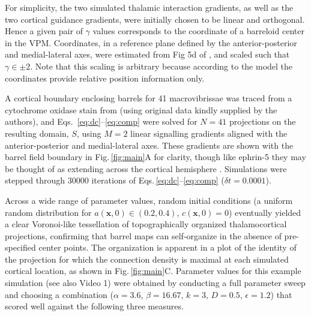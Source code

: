 \documentclass[9pt,lineno]{elife}
\newcommand{\cmnt}[1]{\textcolor{colcmnt}{#1}}
\newcommand{\mb}[1]{\mathbf{#1}}
\begin{document}
\cmnt{For simplicity, the two simulated thalamic interaction gradients, as
  well as the two cortical guidance gradients, were initially chosen to be
  linear and orthogonal. Hence a given pair of $\gamma$ values corresponds to
  the coordinate of a barreloid center in the VPM. Coordinates, in a reference
  plane defined by the anterior-posterior and medial-lateral axes, were
  estimated from Fig 5d of} \cite{haidarliu_size_2001}, \cmnt{and scaled
  such that $\gamma\in\pm 2$. Note that this scaling is arbitrary because
  according to the model the coordinates provide relative position information
  only.}

A cortical boundary enclosing barrels for 41 \cmnt{macrovibrissae} was
traced from a cytochrome oxidase stain from \cite{zheng_signal_2001}
\cmnt{(using original data kindly supplied by the authors)}, and
Eqs.~\ref{eq:dc}--\ref{eq:comp} were solved for $N=41$ projections on the
resulting domain, $S$, using $M=2$ linear signalling gradients aligned with
the anterior-posterior and medial-lateral axes.  \cmnt{These gradients are
  shown with the barrel field boundary in Fig.\,\ref{fig:main}A for clarity,
  though like ephrin-5 they may be thought of as extending across the cortical
  hemisphere \citep{miller_epha7-ephrin-a5_2006}. Simulations were stepped
  through 30000 iterations of Eqs.\,\ref{eq:dc}--\ref{eq:comp} ($\delta
  t=0.0001$).}

\cmnt{Across a wide range of parameter values, random initial conditions (a
  uniform random distribution for $a(\mb{x},0)\in(0.2,0.4)$, $c(\mb{x},0)=0$)
  eventually yielded a clear Voronoi-like tessellation of topographically
  organized thalamocortical projections, confirming that barrel maps can
  self-organize in the absence of pre-specified center points. The
  organization is apparent in a plot of the identity of the projection for
  which the connection density is maximal at each simulated cortical location,
  as shown in Fig.\,\ref{fig:main}C. Parameter values for this example simulation
  (see also Video 1) were obtained by
  conducting a full parameter sweep and choosing a combination
  ($\alpha=3.6$, $\beta=16.67$, $k=3$, $D=0.5$, $\epsilon=1.2$) that scored
  well against the following three measures.}
\end{document}
